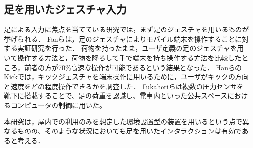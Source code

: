 \documentclass[submit, techrep]{ipsj}
\begin{document}
\subsection{足を用いたジェスチャ入力}
足による入力に焦点を当てている研究では，まず足のジェスチャを用いるものが挙げられる．
Fanら\cite{Fan:2017:ESF:3123021.3123043}は，足のジェスチャによりモバイル端末を操作することに対する実証研究を行った．
荷物を持ったまま，ユーザ定義の足のジェスチャを用いて操作する方法と，荷物を降ろして手で端末を持ち操作する方法を比較したところ，前者の方が70\%高速な操作が可能であるという結果となった．
HanらのKick\cite{Han:2011:KIU:2037373.2037379}では，キックジェスチャを端末操作に用いるために，ユーザがキックの方向と速度をどの程度操作できるかを調査した．
Fukahoriら\cite{Fukahori:2015:ESF:2702123.2702308}は複数の圧力センサを靴下に搭載することで、足の荷重を認識し、電車内といった公共スペースにおけるコンピュータの制御に用いた。\par

本研究は，屋内での利用のみを想定した環境設置型の装置を用いるという点で異なるものの、そのような状況においても足を用いたインタラクションは有効であると考える．
\end{document}
